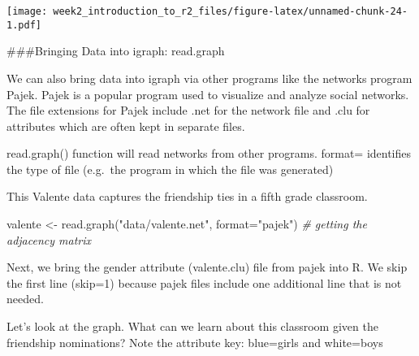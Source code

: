 \documentclass[
]{article}
\newenvironment{Shaded}{\begin{snugshade}}{\end{snugshade}}
\newcommand{\AttributeTok}[1]{\textcolor[rgb]{0.77,0.63,0.00}{#1}}
\newcommand{\CommentTok}[1]{\textcolor[rgb]{0.56,0.35,0.01}{\textit{#1}}}
\newcommand{\DecValTok}[1]{\textcolor[rgb]{0.00,0.00,0.81}{#1}}
\newcommand{\FunctionTok}[1]{\textcolor[rgb]{0.00,0.00,0.00}{#1}}
\newcommand{\NormalTok}[1]{#1}
\newcommand{\OtherTok}[1]{\textcolor[rgb]{0.56,0.35,0.01}{#1}}
\newcommand{\SpecialCharTok}[1]{\textcolor[rgb]{0.00,0.00,0.00}{#1}}
\newcommand{\StringTok}[1]{\textcolor[rgb]{0.31,0.60,0.02}{#1}}
\begin{document}
\texttt{[image: week2\_introduction\_to\_r2\_files/figure-latex/unnamed-chunk-24-1.pdf]}

\#\#\#Bringing Data into igraph: read.graph

We can also bring data into igraph via other programs like the networks
program Pajek. Pajek is a popular program used to visualize and analyze
social networks. The file extensions for Pajek include .net for the
network file and .clu for attributes which are often kept in separate
files.

read.graph() function will read networks from other programs. format=
identifies the type of file (e.g.~the program in which the file was
generated)

This Valente data captures the friendship ties in a fifth grade
classroom.

\begin{Shaded}
\begin{Highlighting}[]
\NormalTok{valente }\OtherTok{\textless{}{-}} \FunctionTok{read.graph}\NormalTok{(}\StringTok{"data/valente.net"}\NormalTok{, }\AttributeTok{format=}\StringTok{"pajek"}\NormalTok{)   }\CommentTok{\# getting the adjacency matrix}
\end{Highlighting}
\end{Shaded}

Next, we bring the gender attribute (valente.clu) file from pajek into
R. We skip the first line (skip=1) because pajek files include one
additional line that is not needed.

\begin{Shaded}
\end{Shaded}

Let's look at the graph. What can we learn about this classroom given
the friendship nominations? Note the attribute key: blue=girls and
white=boys
\end{document}
